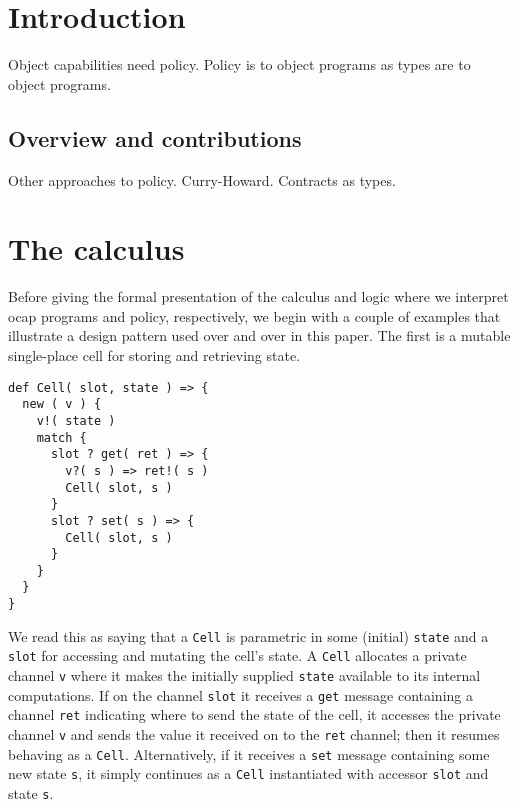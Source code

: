\documentclass[]{amsart}
\theoremstyle{definition}
\theoremstyle{remark}
\numberwithin{equation}{subsection}
\newcommand{\paperversion}{Draft Version 0.1 - July 19, 2013}
\newenvironment{toc}
{
\begin{list}{}{
   \setlength{\leftmargin}{0.4in}
   \setlength{\rightmargin}{0.6in}
   \setlength{\parskip}{0pt}
 } \item }
{\end{list}}
\begin{document}



\section{Introduction}

Object capabilities need policy. Policy is to object programs as types
are to object programs.

\subsection{Overview and contributions} 

Other approaches to policy. Curry-Howard. Contracts as types.


\section{The calculus}

Before giving the formal presentation of the calculus and logic where
we interpret ocap programs and policy, respectively, we begin with a
couple of examples that illustrate a design pattern used over and over
in this paper. The first is a mutable single-place cell for storing
and retrieving state.

\begin{verbatim}
def Cell( slot, state ) => {
  new ( v ) {
    v!( state )
    match {
      slot ? get( ret ) => { 
        v?( s ) => ret!( s )
        Cell( slot, s )
      }
      slot ? set( s ) => {
        Cell( slot, s )
      }
    }
  }
}
\end{verbatim}

We read this as saying that a {\tt Cell} is parametric in some (initial)
{\tt state} and a {\tt slot} for accessing and mutating the
cell's state. A {\tt Cell} allocates a private channel
{\tt v} where it makes the initially supplied {\tt state}
available to its internal computations. If on the channel
{\tt slot} it receives a {\tt get} message containing a
channel {\tt ret} indicating where to send the state of the cell,
it accesses the private channel {\tt v} and sends the value it
received on to the {\tt ret} channel; then it resumes behaving as
a {\tt Cell}. Alternatively, if it receives a {\tt set} message
containing some new state {\tt s}, it simply continues as a
{\tt Cell} instantiated with accessor {\tt slot} and state
{\tt s}.
\end{document}
